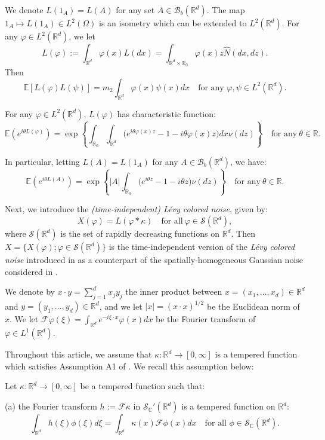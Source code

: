 \documentclass[12pt]{article}
\def\cB{\mathcal{B}}
\def\cF{\mathcal{F}}
\def\cS{\mathcal{S}}
\def\bC{\mathbb{C}}
\def\bE{\mathbb{E}}
\def\bR{\mathbb{R}}
\def\k{\kappa}
\begin{document}
We denote $L(1_A)=L(A)$ for any set $A \in \cB_b(\bR^d)$. The map $1_{A} \mapsto L(1_A) \in L^2(\Omega)$ is an isometry which can be extended to $L^2(\bR^d)$. For any $\varphi \in L^2(\bR^d)$, we let
\[
L(\varphi):=\int_{\bR^d}\varphi(x) L(dx)=\int_{\bR^d \times \bR_0} \varphi(x)z \widehat{N}(dx,dz).
\]
Then
\[
\bE[L(\varphi)L(\psi)]=m_2 \int_{\bR^d}\varphi(x) \psi(x)dx \quad \mbox{for any $\varphi,\psi \in L^2(\bR^d)$}.
\]

For any $\varphi \in L^2(\bR^d)$, $L(\varphi)$ has characteristic function:
\begin{equation}
\label{ch-funct-L}
\bE(e^{i\theta L(\varphi)})=\exp\left\{ \int_{\bR_0} \int_{\bR^d}\big(e^{i\theta \varphi(x) z}-1-i\theta \varphi(x)z\big) dx \nu(dz) \right\} \quad \mbox{for any} \ \theta \in  \bR.
\end{equation}

In particular, letting $L(A)=L(1_{A})$ for any $A \in \cB_b(\bR^d)$, we have:
\[
\bE(e^{i\theta L(A)})=\exp\left\{ |A|\int_{\bR_0} \big(e^{i\theta z}-1-i\theta z\big) \nu(dz) \right\} \quad \mbox{for any} \ \theta \in  \bR.
\]


Next, we introduce the {\em (time-independent) L\'evy colored noise}, given by:
\[
X(\varphi)=L(\varphi*\k) \quad \mbox{for all} \ \varphi \in \cS(\bR^d),
\]
where $\cS(\bR^d)$ is the set of rapidly decreasing functions on $\bR^d$. 
Then $X=\{X(\varphi);\varphi \in \cS(\bR^d)\}$ is the time-independent version of 
the {\em L\'evy colored noise} introduced in \cite{BJ26} as a counterpart of the spatially-homogeneous Gaussian noise considered in \cite{dalang99}.

\medskip


We denote by $x\cdot y=\sum_{j=1}^d x_j y_j$ the inner product between $x=(x_1,\ldots,x_d)\in \bR^d$ and $y=(y_1,\ldots,y_d) \in \bR^d$, and we let $|x |=(x \cdot x)^{1/2}$ be the Euclidean norm of $x$. We let $\cF \varphi(\xi)=\int_{\bR^d}e^{-i\xi \cdot x}\varphi(x)dx$ be the Fourier transform of $\varphi \in L^1(\bR^d)$. 

\medskip

Throughout this article, we assume that $\k:\bR^d \to [0,\infty]$ is a tempered function which satisfies Assumption A1 of \cite{BJ26}. We recall this assumption below: 

\medskip


Let $\k:\bR^d \to [0,\infty]$ be a tempered function such that:

(a) the Fourier transform $h:=\cF \k$ in $\cS_{\bC}'(\bR^d)$ is a tempered function on $\bR^d$:
\[
\int_{\bR^d} h(\xi)\phi(\xi)d\xi=\int_{\bR^d}\k(x) \cF \phi(x)dx \quad \mbox{for all $\phi \in \cS_{\bC}(\bR^d)$}.
\]
\end{document}
